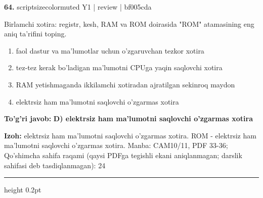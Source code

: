 \documentclass[10pt,a4paper]{article}
\begin{document}
{\bfseries\sffamily\color{ink} 64.} {scriptsizecolor{muted} Y1 | review | bf005cda}
\par
Birlamchi xotira: registr, kesh, RAM va ROM doirasida "ROM" atamasining eng aniq ta'rifini toping.
\begin{enumerate}[label=\Alph*),leftmargin=9mm]
\item faol dastur va ma'lumotlar uchun o'zgaruvchan tezkor xotira
\item tez-tez kerak bo'ladigan ma'lumotni CPUga yaqin saqlovchi xotira
\item RAM yetishmaganda ikkilamchi xotiradan ajratilgan sekinroq maydon
\item elektrsiz ham ma'lumotni saqlovchi o'zgarmas xotira
\end{enumerate}
\begin{tcolorbox}[enhanced,breakable,colback=teal!4,colframe=teal!60!black,boxrule=0.45pt,arc=1.2mm,left=2.7mm,right=2.7mm,top=1.8mm,bottom=1.8mm,before skip=2mm,after skip=2mm]
{\bfseries\sffamily\color{teal}To'g'ri javob:} \textbf{D) elektrsiz ham ma'lumotni saqlovchi o'zgarmas xotira}
\par\smallskip
{\bfseries Izoh:} elektrsiz ham ma'lumotni saqlovchi o'zgarmas xotira. ROM - elektrsiz ham ma'lumotni saqlovchi o'zgarmas xotira. Manba: CAM10/11, PDF 33-36; Qo'shimcha sahifa raqami (qaysi PDFga tegishli ekani aniqlanmagan; darslik sahifasi deb tasdiqlanmagan): 24
\end{tcolorbox}
\vspace{2mm}\hrule height 0.2pt\vspace{3mm}
\end{document}
